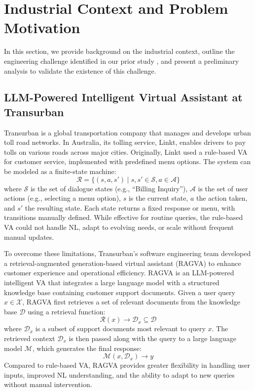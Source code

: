 \section{Industrial Context and Problem Motivation}
\label{sec:background}
In this section, we provide background on the industrial context, outline the engineering challenge identified in our prior study \cite{yang2025ragva}, and present a preliminary analysis to validate the existence of this challenge.

\subsection{LLM-Powered Intelligent Virtual Assistant at Transurban}
Transurban is a global transportation company that manages and develops urban toll road networks. In Australia, its tolling service, Linkt, enables drivers to pay tolls on various roads across major cities.
%
Originally, Linkt used a rule-based VA for customer service, implemented with predefined menu options. The system can be modeled as a finite-state machine:
$$
\mathcal{R} = \{ (s, a, s') \mid s, s' \in \mathcal{S}, a \in \mathcal{A} \}
$$
where $\mathcal{S}$ is the set of dialogue states (e.g., ``Billing Inquiry''), $\mathcal{A}$ is the set of user actions (e.g., selecting a menu option), $s$ is the current state, $a$ the action taken, and $s'$ the resulting state. Each state returns a fixed response or menu, with transitions manually defined. While effective for routine queries, the rule-based VA could not handle NL, adapt to evolving needs, or scale without frequent manual updates.

To overcome these limitations, Transurban’s software engineering team developed a retrieval-augmented generation-based virtual assistant (RAGVA) to enhance customer experience and operational efficiency. RAGVA is an LLM-powered intelligent VA that integrates a large language model with a structured knowledge base containing customer support documents.
%
Given a user query $x \in \mathcal{X}$, RAGVA first retrieves a set of relevant documents from the knowledge base $\mathcal{D}$ using a retrieval function:
$$
\mathcal{R}(x) \rightarrow \mathcal{D}_x \subseteq \mathcal{D}
$$
where $\mathcal{D}_x$ is a subset of support documents most relevant to query $x$. The retrieved context $\mathcal{D}_x$ is then passed along with the query to a large language model $\mathcal{M}$, which generates the final response:
$$
\mathcal{M}(x, \mathcal{D}_x) \rightarrow y
$$
Compared to rule-based VA, RAGVA provides greater flexibility in handling user inputs, improved NL understanding, and the ability to adapt to new queries without manual intervention.

